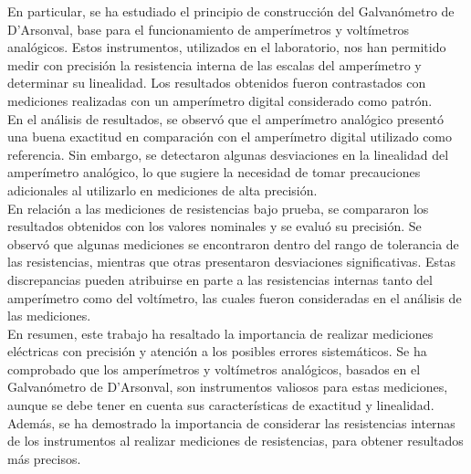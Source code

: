 \documentclass[12pt]{article}
\begin{document}
    En particular, se ha estudiado el principio de construcción del Galvanómetro de D'Arsonval, base para el funcionamiento de amperímetros y voltímetros analógicos. Estos instrumentos, utilizados en el laboratorio, nos han permitido medir con precisión la resistencia interna de las escalas del amperímetro y determinar su linealidad. Los resultados obtenidos fueron contrastados con mediciones realizadas con un amperímetro digital considerado como patrón.\\

    En el análisis de resultados, se observó que el amperímetro analógico presentó una buena exactitud en comparación con el amperímetro digital utilizado como referencia. Sin embargo, se detectaron algunas desviaciones en la linealidad del amperímetro analógico, lo que sugiere la necesidad de tomar precauciones adicionales al utilizarlo en mediciones de alta precisión.\\

    En relación a las mediciones de resistencias bajo prueba, se compararon los resultados obtenidos con los valores nominales y se evaluó su precisión. Se observó que algunas mediciones se encontraron dentro del rango de tolerancia de las resistencias, mientras que otras presentaron desviaciones significativas. Estas discrepancias pueden atribuirse en parte a las resistencias internas tanto del amperímetro como del voltímetro, las cuales fueron consideradas en el análisis de las mediciones.\\

    En resumen, este trabajo ha resaltado la importancia de realizar mediciones eléctricas con precisión y atención a los posibles errores sistemáticos. Se ha comprobado que los amperímetros y voltímetros analógicos, basados en el Galvanómetro de D'Arsonval, son instrumentos valiosos para estas mediciones, aunque se debe tener en cuenta sus características de exactitud y linealidad. Además, se ha demostrado la importancia de considerar las resistencias internas de los instrumentos al realizar mediciones de resistencias, para obtener resultados más precisos.\\
	
	\newpage
	
\end{document}
